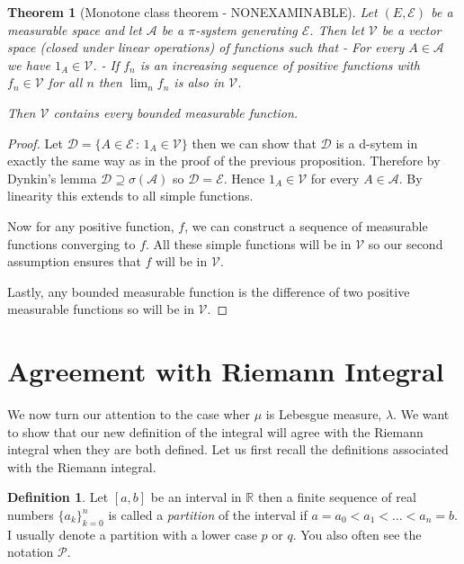 \documentclass[
]{book}
\newtheorem{theorem}{Theorem}[chapter]
\theoremstyle{definition}
\newtheorem{definition}{Definition}[chapter]
\theoremstyle{definition}
\theoremstyle{definition}
\theoremstyle{definition}
\theoremstyle{remark}
\begin{document}
\begin{theorem}[Monotone class theorem - NONEXAMINABLE]
Let \((E, \mathcal{E})\) be a measurable space and let \(\mathcal{A}\) be a \(\pi\)-system generating \(\mathcal{E}\). Then let \(\mathcal{V}\) be a vector space (closed under linear operations) of functions such that
- For every \(A \in \mathcal{A}\) we have \(1_A \in \mathcal{V}\).
- If \(f_n\) is an increasing sequence of positive functions with \(f_n \in \mathcal{V}\) for all \(n\) then \(\lim_n f_n\) is also in \(\mathcal{V}\).

Then \(\mathcal{V}\) contains every bounded measurable function.
\end{theorem}

\begin{proof}
Let \(\mathcal{D} = \{ A \in \mathcal{E} \,:\, 1_A \in \mathcal{V}\}\) then we can show that \(\mathcal{D}\) is a d-sytem in exactly the same way as in the proof of the previous proposition. Therefore by Dynkin's lemma \(\mathcal{D} \supseteq \sigma(\mathcal{A})\) so \(\mathcal{D} = \mathcal{E}\). Hence \(1_A \in \mathcal{V}\) for every \(A \in \mathcal{A}\). By linearity this extends to all simple functions.

Now for any positive function, \(f\), we can construct a sequence of measurable functions converging to \(f\). All these simple functions will be in \(\mathcal{V}\) so our second assumption ensures that \(f\) will be in \(\mathcal{V}\).

Lastly, any bounded measurable function is the difference of two positive measurable functions so will be in \(\mathcal{V}\).
\end{proof}

\hypertarget{agreement-with-riemann-integral}{%
\section{Agreement with Riemann Integral}\label{agreement-with-riemann-integral}}

We now turn our attention to the case wher \(\mu\) is Lebesgue measure, \(\lambda\). We want to show that our new definition of the integral will agree with the Riemann integral when they are both defined. Let us first recall the definitions associated with the Riemann integral.

\begin{definition}
Let \([a,b]\) be an interval in \(\mathbb{R}\) then a finite sequence of real numbers \(\{a_k\}_{k=0}^n\) is called a \emph{partition} of the interval if \(a=a_0 < a_1 < \dots<a_n=b\). I usually denote a partition with a lower case \(p\) or \(q\). You also often see the notation \(\mathscr{P}\).
\end{definition}
\end{document}
